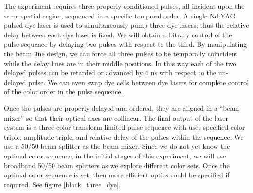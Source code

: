 The experiment requires three properly conditioned pulses, all incident upon the same spatial region, sequenced in a specific temporal order. A single Nd:YAG pulsed dye laser is used to simultaneously pump three dye lasers; thus the relative delay between each dye laser is fixed. We will obtain arbitrary control of the pulse sequence by delaying two pulses with respect to the third. By manipulating the beam line design, we can force all three pulses to be temporally coincident while the delay lines are in their middle positions. In this way each of the two delayed pulses can be retarded or advanced by 4 ns with respect to the un-delayed pulse. We can even swap dye cells between dye lasers for complete control of the color order in the pulse sequence.

Once the pulses are properly delayed and ordered, they are aligned in a ``beam mixer'' so that their optical axes are collinear. The final output of the laser system is a three color transform limited pulse sequence with user specified color triple, amplitude triple, and relative delay of the pulses within the sequence. We use a 50/50 beam splitter as the beam mixer. Since we do not yet know the optimal color sequence, in the initial stages of this experiment, we will use broadband 50/50 beam splitters as we explore different color sets. Once the optimal color sequence is set, then more efficient optics could be specified if required. See figure \ref{block_three_dye}.

